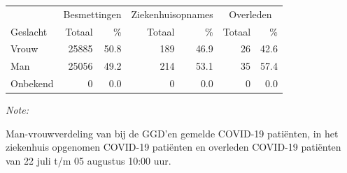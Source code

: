 \documentclass[
  english,
  man,floatsintext]{apa6}
\begin{document}
\begin{table}
\centering\begingroup\fontsize{11}{13}\selectfont

\begin{threeparttable}
\begin{tabular}{lrrrrrr}
\toprule
\multicolumn{1}{c}{ } & \multicolumn{2}{c}{Besmettingen} & \multicolumn{2}{c}{Ziekenhuisopnames} & \multicolumn{2}{c}{Overleden} \\
\cmidrule(l{3pt}r{3pt}){2-3} \cmidrule(l{3pt}r{3pt}){4-5} \cmidrule(l{3pt}r{3pt}){6-7}
Geslacht & Totaal & \% & Totaal & \% & Totaal & \%\\
\midrule
Vrouw & 25885 & 50.8 & 189 & 46.9 & 26 & 42.6\\
Man & 25056 & 49.2 & 214 & 53.1 & 35 & 57.4\\
Onbekend & 0 & 0.0 & 0 & 0.0 & 0 & 0.0\\
\bottomrule
\end{tabular}
\begin{tablenotes}
\item \textit{Note: } 
\item Man-vrouwverdeling van bij de GGD’en gemelde COVID-19 patiënten, in het ziekenhuis opgenomen COVID-19 patiënten en overleden COVID-19 patiënten van 22 juli t/m 05 augustus 10:00 uur.
\end{tablenotes}
\end{threeparttable}
\endgroup{}
\end{table}
\newpage
\end{document}
